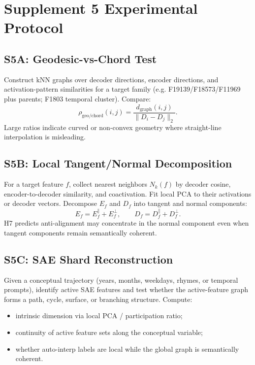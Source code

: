 \documentclass[11pt,a4paper]{article}
\begin{document}
\section{Supplement 5 Experimental Protocol}
\label{sec:protocol}

\subsection{S5A: Geodesic-vs-Chord Test}

Construct kNN graphs over decoder directions, encoder directions, and activation-pattern similarities for a target family (e.g. F19139/F18573/F11969 plus parents; F1803 temporal cluster). Compare:
\[
  \rho_{\mathrm{geo/chord}}(i,j)=\frac{d_{\mathrm{graph}}(i,j)}{\|D_i-D_j\|_2}.
\]
Large ratios indicate curved or non-convex geometry where straight-line interpolation is misleading.

\subsection{S5B: Local Tangent/Normal Decomposition}

For a target feature $f$, collect nearest neighbors $N_k(f)$ by decoder cosine, encoder-to-decoder similarity, and coactivation. Fit local PCA to their activations or decoder vectors. Decompose $E_f$ and $D_f$ into tangent and normal components:
\[
  E_f = E_f^{\parallel}+E_f^{\perp}, \qquad D_f = D_f^{\parallel}+D_f^{\perp}.
\]
H7 predicts anti-alignment may concentrate in the normal component even when tangent components remain semantically coherent.

\subsection{S5C: SAE Shard Reconstruction}

Given a conceptual trajectory (years, months, weekdays, rhymes, or temporal prompts), identify active SAE features and test whether the active-feature graph forms a path, cycle, surface, or branching structure. Compute:
\begin{itemize}[noitemsep]
  \item intrinsic dimension via local PCA / participation ratio;
  \item continuity of active feature sets along the conceptual variable;
  \item whether auto-interp labels are local while the global graph is semantically coherent.
\end{itemize}
\end{document}
